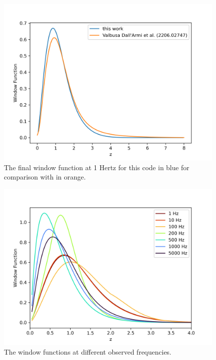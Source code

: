 \begin{figure}[h]
    \centering
    \includegraphics[width=0.8\linewidth]{Images/window_comparison.png}
    \caption{The final window function at 1 Hertz for this code in blue for comparison with \cite{dallarmi_dipole_2022} in orange.}
    \label{window_comparison}
\end{figure} 
\begin{figure}[h]
    \centering
    \includegraphics[width=1\linewidth]{Images/window_diff_frequencies.png}
    \caption{The window functions at different observed frequencies.}
    \label{window_frequencies}
\end{figure} 



